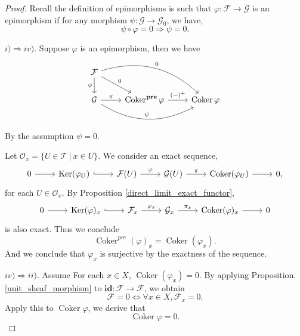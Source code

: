 \documentclass{article}
\numberwithin{equation}{section}
\DeclareMathOperator{\Ker}{Ker}
\DeclareMathOperator{\Coker}{Coker}
\begin{document}
\begin{proof}
Recall the definition of epimorphisms is such that $\varphi:\mathcal{F}\to\mathcal{G}$ is an epimorphism if for any morphism $\psi:\mathcal{G}\to\mathcal{G}_0$, we have,
\begin{equation*}
\psi\circ\varphi=0\Rightarrow \psi = 0.
\end{equation*}

$i)\Rightarrow iv)$.
Suppose $\varphi$ is an epimorphism, then we have
\[
\begin{tikzcd}
\mathcal{F} \arrow[d, "\varphi"'] \arrow[rd, "0"] \arrow[rrd, "0", bend left] &                                                 &               \\
\mathcal{G} \arrow[r, "\pi"] \arrow[rr, "\psi", bend right]                   & \Coker^{\mathbf{pre}}\varphi \arrow[r, "(-)^+"] & \Coker\varphi
\end{tikzcd}
\]
By the assumption $\psi = 0$.\\
\par Let $\mathcal{O}_x = \{U\in\mathcal{T}\:|\: x\in U\}$. We consider an exact sequence,
\[
\begin{tikzcd}
0 \arrow[r] & \Ker(\varphi_U) \arrow[r, hook] & \mathcal{F}(U) \arrow[r, "\varphi"] & \mathcal{G}(U) \arrow[r, "\pi"] & \Coker(\varphi_U) \arrow[r] & 0,
\end{tikzcd}
\]
for each $U\in\mathcal{O}_x$. By Proposition \ref{direct_limit_exact_functor}, 
\[
\begin{tikzcd}
0 \arrow[r] & \Ker(\varphi)_x \arrow[r, hook] & \mathcal{F}_x \arrow[r, "\varphi_x"] & \mathcal{G}_x \arrow[r, "\pi_x"] & \Coker(\varphi)_x \arrow[r] & 0
\end{tikzcd}
\]
is also exact. Thus we conclude 
\begin{equation*}
\Coker^{pre}(\varphi)_x = \Coker(\varphi_x).
\end{equation*}
And we conclude that $\varphi_x$ is surjective by the exactness of the sequence.\\
\par $iv)\Rightarrow ii)$. Assume For each $x\in X$, $\Coker(\varphi_x)=0$. By applying Proposition. \ref{unit_sheaf_morphism} to $\mathbf{id}:\mathcal{F}\to\mathcal{F}$, we obtain
\begin{equation*}
\mathcal{F}=0\Leftrightarrow \forall x\in X, \mathcal{F}_x=0.
\end{equation*}
Apply this to $\Coker\varphi$, we derive that
\begin{equation*}
\Coker\varphi = 0.
\end{equation*}

\end{proof}
\end{document}
